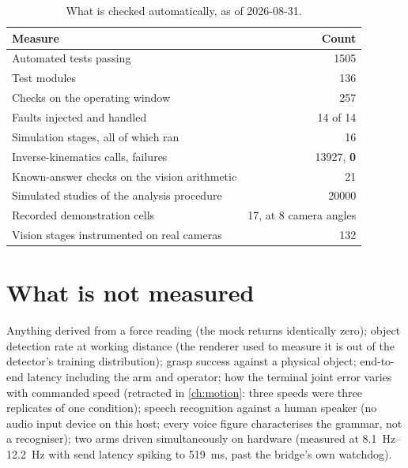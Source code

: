 \begin{table}[htbp]
  \centering
  \caption{What is checked automatically, as of 2026-08-31.}
  \label{tab:verification}
  \begin{tabular}{@{}lr@{}}
    \toprule
    Measure & Count \\
    \midrule
    Automated tests passing & \num{1505} \\
    Test modules & \num{136} \\
    Checks on the operating window & \num{257} \\
    Faults injected and handled & 14 of 14 \\
    Simulation stages, all of which ran & \num{16} \\
    Inverse-kinematics calls, failures & \num{13927}, \textbf{0} \\
    Known-answer checks on the vision arithmetic & \num{21} \\
    Simulated studies of the analysis procedure & \num{20000} \\
    Recorded demonstration cells & 17, at 8 camera angles \\
    Vision stages instrumented on real cameras & \num{132} \\
    \bottomrule
  \end{tabular}
\end{table}

\section{What is not measured}

Anything derived from a force reading (the mock returns identically zero);
object detection rate at working distance (the renderer used to measure it
is out of the detector's training distribution); grasp success against a
physical object; end-to-end latency including the arm and operator; how the
terminal joint error varies with commanded speed (retracted in
\cref{ch:motion}: three speeds were three replicates of one condition);
speech recognition against a human speaker (no audio input device on this
host; every voice figure characterises the grammar, not a recogniser); two
arms driven simultaneously on hardware (measured at \SIrange{8.1}{12.2}{\hertz}
with send latency spiking to \SI{519}{\milli\second}, past the bridge's own
watchdog).
